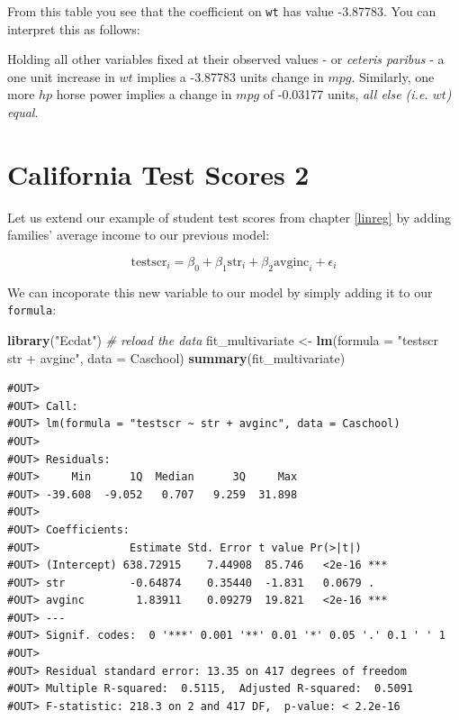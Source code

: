 \documentclass[]{book}
\newenvironment{Shaded}{\begin{snugshade}}{\end{snugshade}}
\newcommand{\KeywordTok}[1]{\textcolor[rgb]{0.13,0.29,0.53}{\textbf{#1}}}
\newcommand{\DataTypeTok}[1]{\textcolor[rgb]{0.13,0.29,0.53}{#1}}
\newcommand{\StringTok}[1]{\textcolor[rgb]{0.31,0.60,0.02}{#1}}
\newcommand{\CommentTok}[1]{\textcolor[rgb]{0.56,0.35,0.01}{\textit{#1}}}
\newcommand{\NormalTok}[1]{#1}
\newenvironment{warning}{\begin{tcolorbox}[colback=orange!5!white,colframe=orange,title=\textbf{Warning!}]}{\end{tcolorbox}}
\theoremstyle{definition}
\theoremstyle{definition}
\theoremstyle{definition}
\theoremstyle{remark}
\begin{document}
From this table you see that the coefficient on \texttt{wt} has value
-3.87783. You can interpret this as follows:

\begin{warning}
Holding all other variables fixed at their observed values - or
\emph{ceteris paribus} - a one unit increase in \(wt\) implies a
-3.87783 units change in \(mpg\). Similarly, one more \(hp\) horse power
implies a change in \(mpg\) of -0.03177 units, \emph{all else (i.e.
\(wt\)) equal}.
\end{warning}

\section{California Test Scores 2}\label{california-test-scores-2}

Let us extend our example of student test scores from chapter
\ref{linreg} by adding families' average income to our previous model:

\[
\text{testscr}_i = \beta_0 + \beta_1  \text{str}_i + \beta_2  \text{avginc}_i + \epsilon_i
\]

We can incoporate this new variable to our model by simply adding it to
our \texttt{formula}:

\begin{Shaded}
\begin{Highlighting}[]
\KeywordTok{library}\NormalTok{(}\StringTok{"Ecdat"}\NormalTok{) }\CommentTok{# reload the data}
\NormalTok{fit_multivariate <-}\StringTok{ }\KeywordTok{lm}\NormalTok{(}\DataTypeTok{formula =} \StringTok{"testscr ~ str + avginc"}\NormalTok{, }\DataTypeTok{data =}\NormalTok{ Caschool)}
\KeywordTok{summary}\NormalTok{(fit_multivariate)}
\end{Highlighting}
\end{Shaded}

\begin{verbatim}
#OUT> 
#OUT> Call:
#OUT> lm(formula = "testscr ~ str + avginc", data = Caschool)
#OUT> 
#OUT> Residuals:
#OUT>     Min      1Q  Median      3Q     Max 
#OUT> -39.608  -9.052   0.707   9.259  31.898 
#OUT> 
#OUT> Coefficients:
#OUT>              Estimate Std. Error t value Pr(>|t|)    
#OUT> (Intercept) 638.72915    7.44908  85.746   <2e-16 ***
#OUT> str          -0.64874    0.35440  -1.831   0.0679 .  
#OUT> avginc        1.83911    0.09279  19.821   <2e-16 ***
#OUT> ---
#OUT> Signif. codes:  0 '***' 0.001 '**' 0.01 '*' 0.05 '.' 0.1 ' ' 1
#OUT> 
#OUT> Residual standard error: 13.35 on 417 degrees of freedom
#OUT> Multiple R-squared:  0.5115,  Adjusted R-squared:  0.5091 
#OUT> F-statistic: 218.3 on 2 and 417 DF,  p-value: < 2.2e-16
\end{verbatim}
\end{document}
